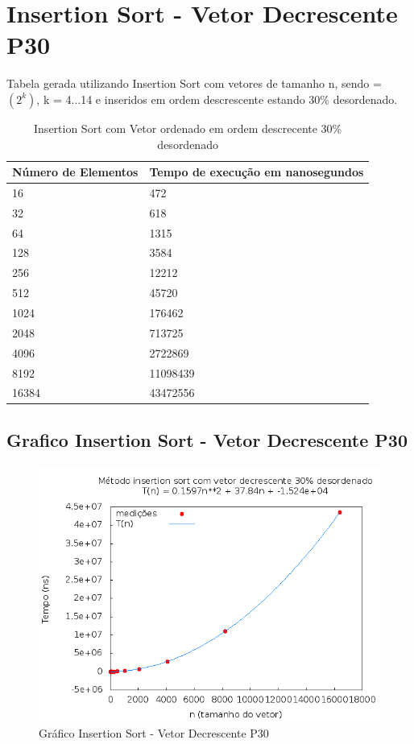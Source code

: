 \documentclass[12pt,a4paper,twoside]{report}
\begin{document}
\section{Insertion Sort - Vetor Decrescente P30}
Tabela gerada utilizando Insertion Sort com vetores de tamanho n, sendo = $(2^k)$, k = 4...14 e inseridos em ordem descrescente estando 30\% desordenado.

\begin{table}[H]
\centering
\caption{Insertion Sort com Vetor ordenado em ordem descrecente 30\% desordenado}
\label{my-label}
\begin{tabular}{|l|l|}
\hline
\multicolumn{1}{|c|}{\textbf{Número de Elementos}} & \multicolumn{1}{c|}{\textbf{Tempo de execução em nanosegundos}} \\ \hline
16 & 472 \\ \hline
32 & 618 \\ \hline
64 & 1315 \\ \hline
128 & 3584 \\ \hline
256 & 12212 \\ \hline
512 & 45720 \\ \hline
1024 & 176462 \\ \hline
2048 & 713725 \\ \hline
4096 & 2722869 \\ \hline
8192 & 11098439 \\ \hline
16384 & 43472556 \\ \hline
\end{tabular}
\end{table}

\subsection{Grafico Insertion Sort - Vetor Decrescente P30}
\begin{figure}[H]
    \centering
    \includegraphics[width=0.7\linewidth]{graficos/Insertion/vIntDecrescenteP30/vIntDecrescenteP30.png}
  \caption{Gráfico Insertion Sort - Vetor Decrescente P30}
\end{figure}
\end{document}
